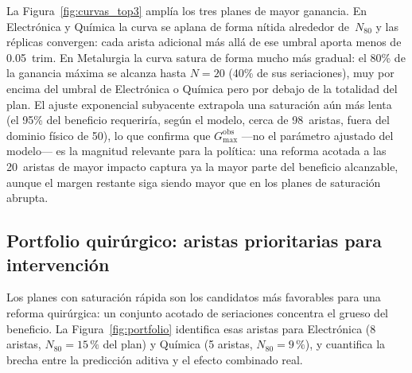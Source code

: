 \documentclass[11pt,letterpaper]{article}
\begin{document}
La Figura~\ref{fig:curvas_top3} amplía los tres planes de mayor ganancia.
En Electrónica y Química la curva se aplana de forma nítida alrededor
de~$N_{80}$ y las réplicas convergen: cada arista adicional más allá de ese
umbral aporta menos de 0.05~trim.
En Metalurgia la curva satura de forma mucho más gradual: el 80\% de la
ganancia máxima se alcanza hasta $N=20$ (40\% de sus seriaciones), muy por
encima del umbral de Electrónica o Química pero por debajo de la totalidad
del plan.
El ajuste exponencial subyacente extrapola una saturación aún más lenta
(el 95\% del beneficio requeriría, según el modelo, cerca de 98~aristas,
fuera del dominio físico de 50), lo que confirma que $G_{\max}^{\mathrm{obs}}$
---no el parámetro ajustado del modelo--- es la magnitud relevante para la
política: una reforma acotada a las 20~aristas de mayor impacto captura ya la
mayor parte del beneficio alcanzable, aunque el margen restante siga siendo
mayor que en los planes de saturación abrupta.

\subsection{Portfolio quirúrgico: aristas prioritarias para intervención}
\label{sec:portfolio}

Los planes con saturación rápida son los candidatos más favorables para una
reforma quirúrgica: un conjunto acotado de seriaciones concentra el grueso del
beneficio.
La Figura~\ref{fig:portfolio} identifica esas aristas para Electrónica
(8 aristas, $N_{80} = 15\,\text{\%}$ del plan) y Química
(5 aristas, $N_{80} = 9\,\text{\%}$), y cuantifica la brecha entre la
predicción aditiva y el efecto combinado real.
\end{document}

